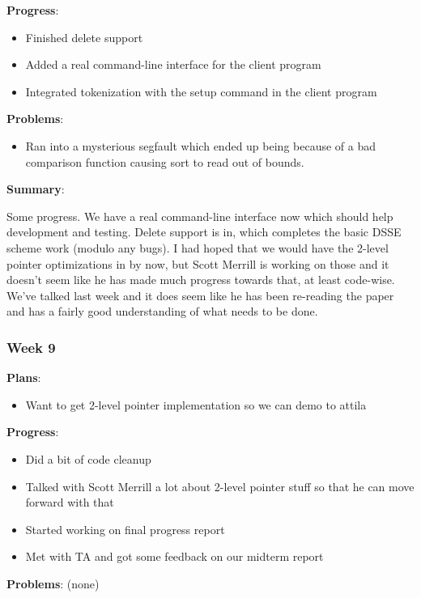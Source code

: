 \noindent \textbf{Progress}: 
\begin{itemize}
\item Finished delete support 
\item Added a real command-line interface for the client program 
\item Integrated tokenization with the setup command in the client program 
\end{itemize}
 
\noindent \textbf{Problems}: 
\begin{itemize}
\item Ran into a mysterious segfault which ended up being because of a bad comparison function causing sort to read out of bounds. 
\end{itemize}

\noindent \textbf{Summary}: 

Some progress. We have a real command-line interface now which should help development and testing. Delete support is in, which completes the basic DSSE scheme work (modulo any bugs). I had hoped that we would have the 2-level pointer optimizations in by now, but Scott Merrill is working on those and it doesn't seem like he has made much progress towards that, at least code-wise. We've talked last week and it does seem like he has been re-reading the paper and has a fairly good understanding of what needs to be done. 


\subsubsection{Week 9}

\noindent \textbf{Plans}:
\begin{itemize}
\item Want to get 2-level pointer implementation so we can demo to attila 
\end{itemize}

\noindent \textbf{Progress}:
\begin{itemize}
\item Did a bit of code cleanup 
\item Talked with Scott Merrill a lot about 2-level pointer stuff so that he can move forward with that 
\item Started working on final progress report 
\item Met with TA and got some feedback on our midterm report 
\end{itemize}

\noindent \textbf{Problems}:
(none)

